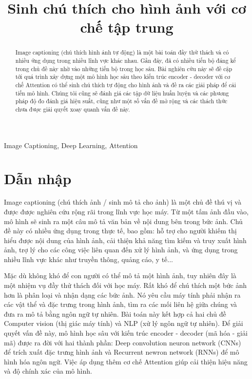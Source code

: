 \documentclass[conference]{IEEEtran}
\begin{document}
\title{Sinh chú thích cho hình ảnh với cơ chế tập trung\\}
\author{
}
\maketitle

\begin{abstract}
Image captioning (chú thích hình ảnh tự động) là một bài toán đầy thử thách và có nhiều ứng dụng trong nhiều lĩnh vực khác nhau.
Gần đây, đã có nhiều tiến bộ đáng kể trong chủ đề này nhờ vào những tiến bộ trong học sâu.
Bài nghiên cứu này sẽ đề cập tới quá trình xây dựng một mô hình học sâu theo kiến trúc encoder - decoder với cơ chế Attention có thể sinh chú thích tự động cho hình ảnh và đề ra các giải pháp để cải tiến mô hình.
Chúng tôi cũng sẽ đánh giá các tập dữ liệu huấn luyện và các phương pháp độ đo đánh giá hiệu suất, cũng như một số vấn đề mở rộng và các thách thức chưa được giải quyết xoay quanh vấn đề này.
\end{abstract} 

\begin{IEEEkeywords}
Image Captioning, Deep Learning, Attention
\end{IEEEkeywords}

\section{Dẫn nhập}
Image captioning (chú thích ảnh / sinh mô tả cho ảnh) là một chủ đề thú vị và được được nghiên cứu rộng rãi trong lĩnh vực học máy.
Từ một tấm ảnh đầu vào, mô hình sẽ sinh ra một câu mô tả văn bản về nội dung bên trong bức ảnh.
Chủ đề này có nhiều ứng dụng trong thực tế, bao gồm: hỗ trợ cho người khiếm thị hiểu được nội dung của hình ảnh, cải thiện khả năng tìm kiếm và truy xuất hình ảnh, trợ lý cho các công việc liên quan đến xử lý hình ảnh, và ứng dụng trong nhiều lĩnh vực khác như truyền thông, quảng cáo, y tế... 

Mặc dù không khó để con người có thể mô tả một hình ảnh, tuy nhiên đây là một nhiệm vụ đầy thử thách đối với học máy.
Rất khó để chú thích một bức ảnh hơn là phân loại và nhận dạng các bức ảnh.
Nó yêu cầu máy tính phải nhận ra các vật thể và đặc trưng trong hình ảnh, tìm ra các mối liên hệ giữa chúng và đưa ra mô tả bằng ngôn ngữ tự nhiên.
Bài toán này kết hợp cả hai chủ đề Computer vision (thị giác máy tính) và NLP (xử lý ngôn ngữ tự nhiên).
Để giải quyết vấn đề này, mô hình học sâu với kiến trúc encoder - decoder (mã hóa - giải mã) được ra đời với hai thành phần: Deep convolution neuron network (CNNs) để trích xuất đặc trưng hình ảnh và Recurrent newron network (RNNs) để mô hình hóa ngôn ngữ. Việc áp dụng thêm cơ chế Attention giúp cải thiện hiệu năng và độ chính xác của mô hình.
\end{document}
